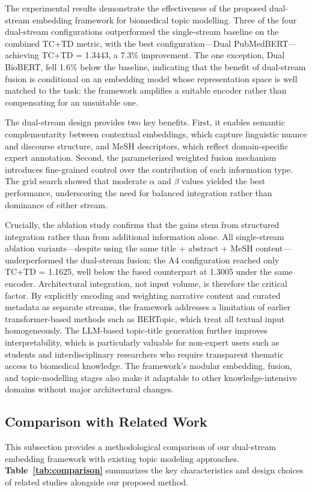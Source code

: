 \documentclass[authorproof,JACIII,researchpaper]{fujipressarticle}
\begin{document}
{\color{red}%
The experimental results demonstrate the effectiveness of the proposed dual-stream embedding framework for biomedical topic modelling. Three of the four dual-stream configurations outperformed the single-stream baseline on the combined TC+TD metric, with the best configuration---Dual PubMedBERT---achieving TC+TD = 1.3443, a 7.3\% improvement. The one exception, Dual BioBERT, fell 1.6\% below the baseline, indicating that the benefit of dual-stream fusion is conditional on an embedding model whose representation space is well matched to the task: the framework amplifies a suitable encoder rather than compensating for an unsuitable one.
}%

The dual-stream design provides two key benefits. {\color{red}First, it enables semantic complementarity between contextual embeddings, which capture linguistic nuance and discourse structure, and MeSH descriptors, which reflect domain-specific expert annotation.} {\color{red}Second, the parameterized weighted fusion mechanism introduces fine-grained control over the contribution of each information type.} {\color{red}The grid search showed that moderate $\alpha$ and $\beta$ values yielded the best performance, underscoring the need for balanced integration rather than dominance of either stream.}

{\color{red}%
Crucially, the ablation study confirms that the gains stem from structured integration rather than from additional information alone. All single-stream ablation variants---despite using the same title + abstract + MeSH content---underperformed the dual-stream fusion; the A4 configuration reached only TC+TD = 1.1625, well below the fused counterpart at 1.3005 under the same encoder. Architectural integration, not input volume, is therefore the critical factor. By explicitly encoding and weighting narrative content and curated metadata as separate streams, the framework addresses a limitation of earlier transformer-based methods such as BERTopic, which treat all textual input homogeneously. The LLM-based topic-title generation further improves interpretability, which is particularly valuable for non-expert users such as students and interdisciplinary researchers who require transparent thematic access to biomedical knowledge. The framework's modular embedding, fusion, and topic-modelling stages also make it adaptable to other knowledge-intensive domains without major architectural changes.
}%

\subsection{Comparison with Related Work}
This subsection provides a methodological comparison of our dual-stream embedding framework with existing topic modeling approaches. {\color{red}\textbf{Table~\ref{tab:comparison}} summarizes the key characteristics and design choices of related studies alongside our proposed method.}
\end{document}
